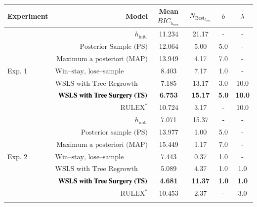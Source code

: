 \documentclass[doc,natbib,floatsintext]{apa7}
\newcommand{\hr}{h_{\mathrm{rev.}}}
\newcommand{\hi}{h_{\mathrm{init.}}}
\begin{document}
\begin{appendices}
\begin{table}[!ht]
\begin{center}
\begin{tabular}{l r c c c c} 
\small
Experiment & Model & Mean $BIC_{\hr}$ & $N_{\text{Best}_{\hr}}$ & $b$ & $\lambda$ \\ 
\toprule
\multirow{7}{*}{Exp. 1} & $\hi$ & 11.234 & 21.17 & - & -\\
& $\text{Posterior Sample (PS)}$ & 12.064 & 5.00 & 5.0 & -\\
& $\text{Maximum a posteriori (MAP)}$ & 13.949 & 4.17 & 7.0 & -\\
& $\text{Win--stay, lose--sample (WSLS)}$ & 8.403 & 7.17 & 1.0 & -\\
& $\text{WSLS with Tree Regrowth (TR)}$ & 7.185 & 13.17 & 3.0 & 10.0\\
& $\text{\textbf{WSLS with Tree Surgery (TS)}}$ & \textbf{6.753} & \textbf{15.17} & \textbf{5.0} & \textbf{10.0}\\
& $\text{RULEX}^*$ & 10.724 & 3.17 & - & 10.0\\
\midrule
\multirow{7}{*}{Exp. 2} & $\hi$ & 7.071 & 15.37 & - & -\\
& $\text{Posterior sample (PS)}$ & 13.977 & 1.00 & 5.0 & -\\
& $\text{Maximum a posteriori (MAP)}$ & 15.449 & 1.17 & 7.0 & -\\
& $\text{Win--stay, lose--sample (WSLS)}$ & 7.443 & 0.37 & 1.0 & -\\
& $\text{WSLS with Tree Regrowth (TR)}$ & 5.089 & 4.37 & 1.0 & 1.0\\
& $\text{\textbf{WSLS with Tree Surgery (TS)}}$ & \textbf{4.681} & \textbf{11.37} & \textbf{1.0} & \textbf{1.0}\\
& $\text{RULEX}^*$ & 10.453 & 2.37 & - & 3.0\\
\bottomrule
\label{table:table_a8_8_mean_prob_100000k}
\end{tabular}
\end{center} 
\end{table}


\end{appendices}
\end{document}
